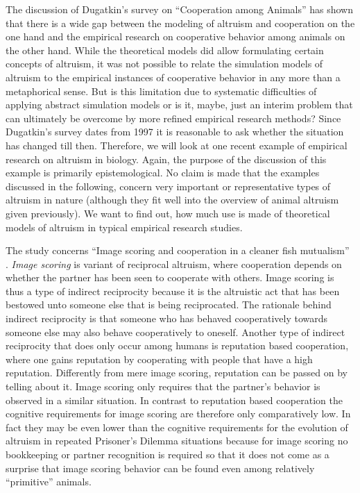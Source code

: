 The discussion of Dugatkin's survey on ``Cooperation among Animals'' has shown
that there is a wide gap between the modeling of altruism and cooperation on the
one hand and the empirical research on cooperative behavior among animals on
the other hand. While the theoretical models did allow formulating certain
concepts of altruism, it was not possible to relate the simulation models of
altruism to the empirical instances of cooperative behavior in any more than
a metaphorical sense. But is this limitation due to systematic difficulties of
applying abstract simulation models or is it, maybe, just an interim problem
that can ultimately be overcome by more refined empirical research methods?
Since Dugatkin's survey dates from 1997 it is reasonable to ask whether the
situation has changed till then. Therefore, we will look at one recent
example of empirical research on altruism in biology. Again, the purpose of
the discussion of this example is primarily epistemological. No claim is
made that the examples discussed in the following, concern very important or
representative types of altruism in nature (although they fit well into the
overview of animal altruism given previously).  We want to find out, how much
use is made of theoretical models of altruism in typical empirical research
studies.

The study concerns ``Image scoring and cooperation in a cleaner fish
mutualism'' \cite[]{bshary-grutter:2006}. {\em Image scoring} is variant of
reciprocal altruism, where cooperation depends on whether the partner has been
seen to cooperate with others. Image scoring is thus a type of indirect
reciprocity because it is the altruistic act that has been bestowed unto
someone else that is being reciprocated. The rationale behind indirect
reciprocity is that someone who has behaved cooperatively towards someone else
may also behave cooperatively to oneself. Another type of indirect reciprocity
that does only occur among humans is reputation based cooperation, where one
gains reputation by cooperating with people that have a high
reputation. Differently from mere image scoring, reputation can be passed on by
telling about it. Image scoring only requires that the partner's behavior is
observed in a similar situation. In contrast to reputation based cooperation
the cognitive requirements for image scoring are therefore only comparatively
low. In fact they may be even lower than the cognitive requirements for the
evolution of altruism in repeated Prisoner's Dilemma situations because for
image scoring no bookkeeping or partner recognition is required so that it
does not come as a surprise that image scoring behavior can be found even
among relatively ``primitive'' animals.

